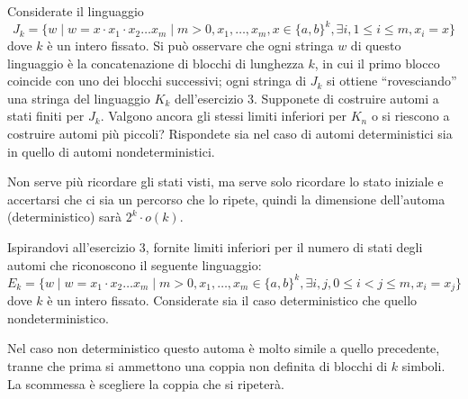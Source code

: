 \documentclass[12pt, answers]{exam}
\begin{document}
\begin{questions}
	\question Considerate il linguaggio
	$$ J_k = \{ w \mid w = x \cdot x_1 \cdot x_2 \dots x_m \mid m > 0, x_1, \dots, x_m, x \in \{a, b\}^k, \exists i, 1 \leq i \leq m, x_i = x\} $$
	dove $k$ è un intero fissato.
	Si può osservare che ogni stringa $w$ di questo linguaggio è la concatenazione di blocchi di lunghezza $k$, in cui il primo blocco coincide con uno dei blocchi successivi; ogni stringa di $J_k$ si ottiene ``rovesciando'' una stringa del linguaggio $K_k$ dell'esercizio 3.
	Supponete di costruire automi a stati finiti per $J_k$.
	Valgono ancora gli stessi limiti inferiori per $K_n$ o si riescono a costruire automi più piccoli?
	Rispondete sia nel caso di automi deterministici sia in quello di automi nondeterministici.
	\begin{solution}
		Non serve più ricordare gli stati visti, ma serve solo ricordare lo stato iniziale e accertarsi che ci sia un percorso che lo ripete, quindi la dimensione dell'automa (deterministico) sarà $2^k \cdot o(k)$.
	\end{solution}
	\question Ispirandovi all'esercizio 3, fornite limiti inferiori per il numero di stati degli automi che riconoscono il seguente linguaggio:
	$$ E_k = \{ w \mid w = x_1 \cdot x_2 \dots x_m \mid m > 0, x_1, \dots, x_m \in \{a, b\}^k, \exists i, j, 0 \leq i < j \leq m, x_i = x_j \} $$
	dove $k$ è un intero fissato.
	Considerate sia il caso deterministico che quello nondeterministico.
	\begin{solution}
		Nel caso non deterministico questo automa è molto simile a quello precedente, tranne che prima si ammettono una coppia non definita di blocchi di $k$ simboli.
		La scommessa è scegliere la coppia che si ripeterà.

	\end{solution}
\end{questions}
\end{document}
